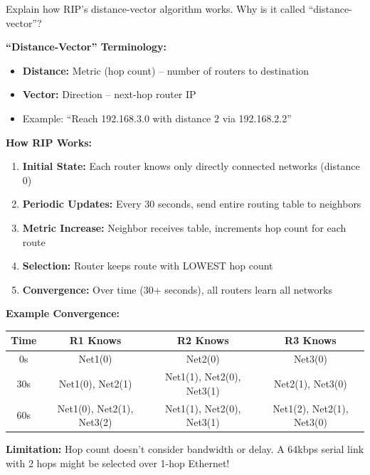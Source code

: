 \documentclass[12pt,a4paper]{article}
\begin{document}
\begin{qbox}{Explain how RIP's distance-vector algorithm works. Why is it called ``distance-vector''?}
\end{qbox}

\begin{abox}
\textbf{``Distance-Vector'' Terminology:}
\begin{itemize}
    \item \textbf{Distance:} Metric (hop count) -- number of routers to destination
    \item \textbf{Vector:} Direction -- next-hop router IP
    \item Example: ``Reach 192.168.3.0 with distance 2 via 192.168.2.2''
\end{itemize}

\textbf{How RIP Works:}

\begin{enumerate}
    \item \textbf{Initial State:} Each router knows only directly connected networks (distance 0)
    
    \item \textbf{Periodic Updates:} Every 30 seconds, send entire routing table to neighbors
    
    \item \textbf{Metric Increase:} Neighbor receives table, increments hop count for each route
    
    \item \textbf{Selection:} Router keeps route with LOWEST hop count
    
    \item \textbf{Convergence:} Over time (30+ seconds), all routers learn all networks
\end{enumerate}

\textbf{Example Convergence:}
\begin{center}
\begin{tabular}{cccc}
\toprule
Time & R1 Knows & R2 Knows & R3 Knows \\
\midrule
0s & Net1(0) & Net2(0) & Net3(0) \\
30s & Net1(0), Net2(1) & Net1(1), Net2(0), Net3(1) & Net2(1), Net3(0) \\
60s & Net1(0), Net2(1), Net3(2) & Net1(1), Net2(0), Net3(1) & Net1(2), Net2(1), Net3(0) \\
\bottomrule
\end{tabular}
\end{center}

\textbf{Limitation:} Hop count doesn't consider bandwidth or delay. A 64kbps serial link with 2 hops might be selected over 1-hop Ethernet!
\end{abox}
\end{document}
